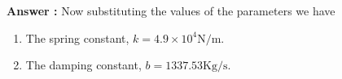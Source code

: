 \documentclass[journal,12pt,twocolumn]{IEEEtran}
\theoremstyle{remark}
\begin{document}
\begin{enumerate}
\textbf{Answer :}
Now substituting the values of the parameters  we have \\
\begin{enumerate}
\item  The spring constant, $k=4.9\times10^4 \text{N/m}$.
\item  The damping constant, $b=1337.53 \text{Kg/s}$.
\end{enumerate}
\end{enumerate}
\end{document}
